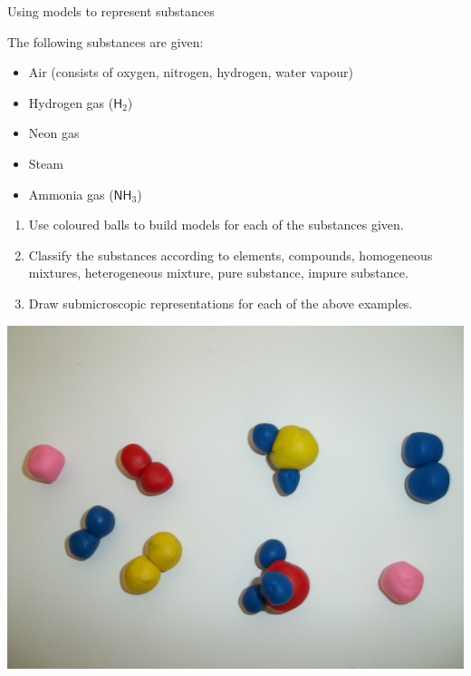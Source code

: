 \vspace{-1cm}
  \label{m38708*eip-326}
\begin{activity}{Using models to represent substances}{
\begin{minipage}{.5\textwidth}
The following substances are given:
\label{m38708*eip-id1166921187210}
\begin{itemize}[noitemsep]
    \item Air (consists of oxygen, nitrogen, hydrogen, water vapour)
    \item Hydrogen gas ($\mathsf{H}_2$)
    \item Neon gas
    \item Steam
    \item Ammonia gas ($\mathsf{NH}_3$)
\end{itemize}
\noindent
\begin{enumerate}[noitemsep, label=\textbf{\arabic*}.]
\item Use coloured balls to build models for each of the substances given.
\item Classify the substances according to elements, compounds, homogeneous mixtures, heterogeneous mixture, pure substance, impure substance.
\item Draw submicroscopic representations for each of the above examples.
\end{enumerate}
\end{minipage}
\begin{minipage}{.5\textwidth}
\begin{center}
 \includegraphics[width=.8\textwidth]{photos/models_classification.jpg}\par
\end{center}
\end{minipage}
}
\end{activity}

